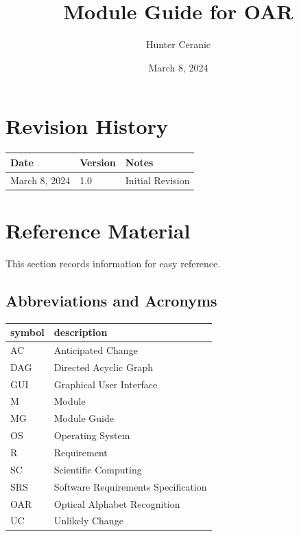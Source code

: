 \documentclass[12pt, titlepage]{article}
\begin{document}
\title{Module Guide for OAR} 
\author{Hunter Ceranic}
\date{March 8, 2024}

\maketitle


\section{Revision History}

\begin{tabularx}{\textwidth}{p{3cm}p{2cm}X}
\toprule {\bf Date} & {\bf Version} & {\bf Notes}\\
\midrule
March 8, 2024 & 1.0 & Initial Revision\\
\bottomrule
\end{tabularx}

\newpage

\section{Reference Material}

This section records information for easy reference.

\subsection{Abbreviations and Acronyms}

\renewcommand{\arraystretch}{1.2}
\begin{tabular}{l l} 
  \toprule		
  \textbf{symbol} & \textbf{description}\\
  \midrule 
  AC & Anticipated Change\\
  DAG & Directed Acyclic Graph \\
  GUI & Graphical User Interface \\
  M & Module \\
  MG & Module Guide \\
  OS & Operating System \\
  R & Requirement\\
  SC & Scientific Computing \\
  SRS & Software Requirements Specification\\
  OAR & Optical Alphabet Recognition\\
  UC & Unlikely Change \\
  \bottomrule
\end{tabular}\\
\end{document}
